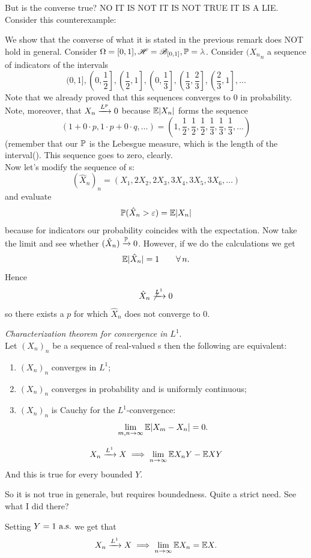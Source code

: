 \documentclass{report}
\begin{document}
But is the converse true? NO IT IS NOT IT IS NOT TRUE IT IS A LIE. Consider this counterexample:
\begin{example}
	We show that the converse of what it is stated in the previous remark does NOT hold in general. Consider $\Omega=[0,1],\HS=\B_{[0,1]},\pr=\leb$. Consider ${(X_n}_{n}$ a sequence of indicators of the intervals
	\[(0,1],\left(0,\dfrac{1}{2}\right],\left(\dfrac{1}{2},1\right],\left(0,\dfrac{1}{3}\right],\left(\dfrac{1}{3},\dfrac{2}{3}\right],\left(\dfrac{2}{3},1\right],\ldots\]
	Note that we already proved that this sequences converges to 0 in probability. Note, moreover, that $X_n\xrightarrow[]{L^{p}}0$ because $\mathbb{E}|X_n|$ forms the sequence $$\left(1+0\cdot p,1\cdot p+0\cdot q,\ldots\right)=\left(1,\frac{1}{2},\frac{1}{2},\frac{1}{2},\frac{1}{3},\frac{1}{3},\frac{1}{3},\ldots\right)$$ (remember that our $\mathbb{P}$ is the Lebesgue measure, which is the length of the interval(). This sequence goes to zero, clearly.\\
	Now let's modify the sequence of \rv s:
	\[{(\hat{X}_{n})}_{n}=(X_1,2X_2,2X_3,3X_4,3X_5,3X_6,\ldots)\]
	and evaluate
	\[\mathbb{P}(\hat{X}_n>\varepsilon)=\mathbb{E} |X_n|\]
	because for indicators our probability coincides with the expectation. Now take the limit and see whether $(\hat{X}_{n})\xrightarrow[]{\mathbb{P}}0$. However, if we do the calculations we get
	\[\mathbb{E}|\hat{X}_{n}|=1\qquad\forall\, n.\]
	Hence
	\[\hat{X}_{n}\not\xrightarrow[]{L^{1}}0\]
	so there exists a $p$ for which $\hat{X}_{n}$ does not converge to 0.
\end{example}
\begin{theorem}
	\emph{Characterization theorem for convergence in $L^1$}.\\
	Let ${(X_n)}_{n}$ be a sequence of real-valued \rv s then the following are equivalent:
	\begin{enumerate}[\circnum]
		\item ${(X_n)}_{n}$ converges in $L^{1}$;
		\item ${(X_n)}_{n}$ converges in probability and is uniformly continuous;
		\item ${(X_n)}_{n}$ is Cauchy for the $L^{1}$-convergence:
		\[\lim_{m,n\to\infty}\mathbb{E}|X_m-X_n|=0.\]
	\end{enumerate}
\end{theorem}
\begin{proposition}
	\[X_n\xrightarrow[]{L^{1}}X\implies\lim_{n\to\infty}\mathbb{E} X_n Y-\mathbb{E} XY\]
	And this is true for every bounded \rv{} $Y$.
\end{proposition}
So it is not true in generale, but requires boundedness. Quite a strict need. See what I did there?
\begin{remark}
	Setting $Y=1\text{ a.s.}$ we get that
	\[X_n\xrightarrow[]{L^{1}}X\implies\lim_{n\to\infty}\mathbb{E} X_n=\mathbb{E} X.\]
\end{remark}
\end{document}
